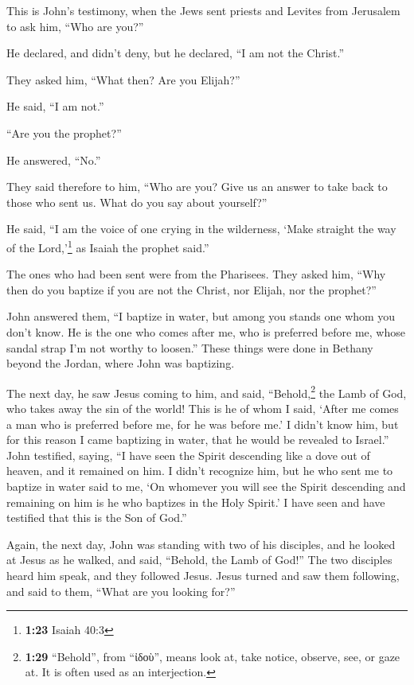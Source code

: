  This is John's testimony, when the Jews sent priests and
Levites from Jerusalem to ask him, ``Who are you?''

 He declared, and didn't deny, but he declared, ``I am
not the Christ.''

 They asked him, ``What then? Are you Elijah?''

He said, ``I am not.''

``Are you the prophet?''

He answered, ``No.''

 They said therefore to him, ``Who are you? Give us an
answer to take back to those who sent us. What do you say about
yourself?''

 He said, ``I am the voice of one crying in the
wilderness, `Make straight the way of the Lord,'\footnote{\textbf{1:23}
  Isaiah 40:3} as Isaiah the prophet said.''

 The ones who had been sent were from the Pharisees.
 They asked him, ``Why then do you baptize if you are not
the Christ, nor Elijah, nor the prophet?''

 John answered them, ``I baptize in water, but among you
stands one whom you don't know.  He is the one who comes
after me, who is preferred before me, whose sandal strap I'm not worthy
to loosen.''  These things were done in Bethany beyond
the Jordan, where John was baptizing.

 The next day, he saw Jesus coming to him, and said,
``Behold,\footnote{\textbf{1:29} ``Behold'', from ``ἰδοὺ'', means look
  at, take notice, observe, see, or gaze at. It is often used as an
  interjection.} the Lamb of God, who takes away the sin of the world!
 This is he of whom I said, `After me comes a man who is
preferred before me, for he was before me.'  I didn't
know him, but for this reason I came baptizing in water, that he would
be revealed to Israel.''  John testified, saying, ``I
have seen the Spirit descending like a dove out of heaven, and it
remained on him.  I didn't recognize him, but he who sent
me to baptize in water said to me, `On whomever you will see the Spirit
descending and remaining on him is he who baptizes in the Holy Spirit.'
 I have seen and have testified that this is the Son of
God.''

 Again, the next day, John was standing with two of his
disciples,  and he looked at Jesus as he walked, and
said, ``Behold, the Lamb of God!''  The two disciples
heard him speak, and they followed Jesus.  Jesus turned
and saw them following, and said to them, ``What are you looking for?''

